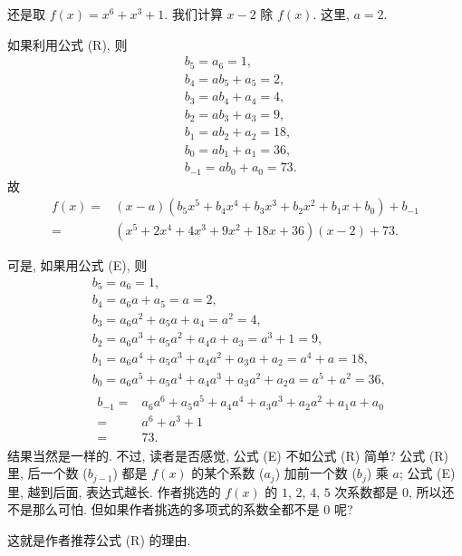 \begin{example}
    还是取 $f(x) = x^6 + x^3 + 1$. 我们计算 $x - 2$ 除 $f(x)$. 这里, $a = 2$.

    如果利用公式 (R), 则
    \begin{align*}
         & b_5 = a_6 = 1,            \\
         & b_4 = ab_5 + a_5 = 2,     \\
         & b_3 = ab_4 + a_4 = 4,     \\
         & b_2 = ab_3 + a_3 = 9,     \\
         & b_1 = ab_2 + a_2 = 18,    \\
         & b_0 = ab_1 + a_1 = 36,    \\
         & b_{-1} = ab_0 + a_0 = 73.
    \end{align*}
    故
    \begin{align*}
        f(x)
        = {} & (x - a)(b_5 x^5 + b_4 x^4 + b_3 x^3 + b_2 x^2 + b_1 x + b_0) + b_{-1} \\
        = {} & (x^5 + 2x^4 + 4x^3 + 9x^2 + 18x + 36) (x-2) + 73.
    \end{align*}

    可是, 如果用公式 (E), 则
    \begin{align*}
         & b_5 = a_6 = 1,                                                        \\
         & b_4 = a_6 a + a_5 = a = 2,                                            \\
         & b_3 = a_6 a^2 + a_5 a + a_4 = a^2 = 4,                                \\
         & b_2 = a_6 a^3 + a_5 a^2 + a_4 a + a_3 = a^3 + 1 = 9,                  \\
         & b_1 = a_6 a^4 + a_5 a^3 + a_4 a^2 + a_3 a + a_2 = a^4 + a = 18,       \\
         & b_0 = a_6 a^5 + a_5 a^4 + a_4 a^3 + a_3 a^2 + a_2 a = a^5 + a^2 = 36, \\
         & \begin{aligned}
            b_{-1}
            = {} & a_6 a^6 + a_5 a^5 + a_4 a^4 + a_3 a^3 + a_2 a^2 + a_1 a + a_0 \\
            = {} & a^6 + a^3 + 1                                                 \\
            = {} & 73.
        \end{aligned}
    \end{align*}
    结果当然是一样的. 不过, 读者是否感觉, 公式 (E) 不如公式 (R) 简单? 公式 (R) 里, 后一个数 ($b_{j-1}$) 都是 $f(x)$ 的某个系数 ($a_j$) 加前一个数 ($b_j$) 乘 $a$; 公式 (E) 里, 越到后面, 表达式越长. 作者挑选的 $f(x)$ 的 $1$, $2$, $4$, $5$ 次系数都是 $0$, 所以还不是那么可怕. 但如果作者挑选的多项式的系数全都不是 $0$ 呢?

    这就是作者推荐公式 (R) 的理由.
\end{example}

